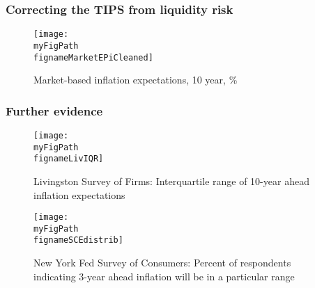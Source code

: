 \documentclass[10pt]{beamer}
\def \myFigPath {../../../figures/}
\def\fignameMarketEPiCleaned{cleaned_epi10_2020_07_28}
\def\fignameSCEdistrib{SCE_distrib_topbottom_command_anchoring_in_data_14_Sep_2020_18_12_59}
\def\fignameLivIQR{Livingston_IQR_command_anchoring_in_data_14_Sep_2020_18_12_59}
\begin{document}
\begin{frame}[plain]  %
\frametitle{Correcting the TIPS from liquidity risk}

\begin{figure}[h!]
\texttt{[image: \\myFigPath \\fignameMarketEPiCleaned]} %
\caption{Market-based inflation expectations, 10 year, \%}
\label{epi_cleaned}
\end{figure}

\vfill 
\hyperlink{LRE_drifting_down}{}	

\end{frame}


\begin{frame}
	\frametitle{Further evidence}\label{further_evidence}


\begin{figure}[h!]
\caption{Livingston Survey of Firms: \newline Interquartile range of 10-year ahead inflation expectations}
\texttt{[image: \\myFigPath \\fignameLivIQR]}
\label{LivIQR}
\end{figure}

\vfill 
\hyperlink{systematically}{}	

\end{frame}

\begin{frame}

\begin{figure}[h!]
\caption{New York Fed Survey of Consumers: \newline Percent of respondents indicating 3-year ahead inflation will be in a particular range}
\texttt{[image: \\myFigPath \\fignameSCEdistrib]}
\label{SCEdistrib}
\end{figure}

\vfill 
\hyperlink{systematically}{}	

\end{frame}
\end{document}
